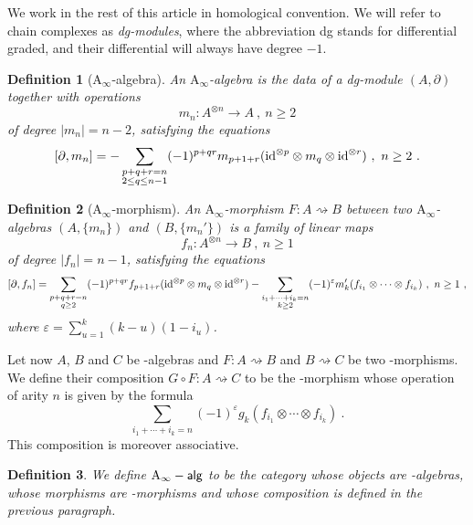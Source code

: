 \documentclass[twoside, 12pt]{amsart}
\newtheorem{definition}{Definition}[section]
\theoremstyle{remark}
\begin{document}
We work in the rest of this article in homological convention. We will refer to chain complexes as \emph{dg-modules}, where the abbreviation dg stands for differential graded, and their differential will always have degree $-1$.

\begin{definition}[$\mathrm{A}_\infty$-algebra] \label{def:ainf-alg} An \emph{$\mathrm{A}_\infty$-algebra} is the data of a dg-module $(A,\partial)$ together with operations \[ m_n : A^{\otimes n} \to A \ , \ n \geq 2 \] of degree $|m_n|=n-2$, satisfying the equations 
\[ [ \partial , m_n ] = - \sum_{\substack{p+q+r=n \\ 2 \leq q \leq n-1}} (-1)^{p+qr}m_{p+1+r}(\mathrm{id}^{\otimes p} \otimes m_q \otimes \mathrm{id}^{\otimes r}) \ , \ n\geq 2 \ . \]
\end{definition}

\begin{definition}[$\mathrm{A}_\infty$-morphism] \label{def:ainf-morph}
An \emph{$\mathrm{A}_\infty$-morphism} $F : A\rightsquigarrow B$ between two $\mathrm{A}_\infty$-algebras $(A,\{m_n\})$ and $(B,\{m_n'\})$ is a family of linear maps \[f_n : A^{\otimes n} \to B \ , \ n \geq 1\] of degree $|f_n|=n-1$, satisfying the equations  \[
 [ \partial , f_n] =  \sum_{\substack{p+q+r=n \\ q \geq 2}} (-1)^{p+qr}f_{p+1+r}(\mathrm{id}^{\otimes p} \otimes m_q \otimes \mathrm{id}^{\otimes r}) -  \sum_{\substack{i_1+\cdots+i_k=n \\ k \geq 2}} (-1)^{\varepsilon} m_k'(f_{i_1}\otimes\cdots\otimes f_{i_k})  \ , \ n \geq 1 \ ,\] where $\varepsilon = \sum_{u=1}^{k}(k-u)(1-i_u)$.
\end{definition}

Let now $A$, $B$ and $C$ be \Ainf -algebras and $F : A \rightsquigarrow B$ and $B \rightsquigarrow C$ be two \Ainf -morphisms. We define their composition $G \circ F : A \rightsquigarrow C$ to be the \Ainf -morphism whose operation of arity $n$ is given by the formula
\[ \sum_{i_1+\cdots+i_k=n} (-1)^{\varepsilon} g_k(f_{i_1}\otimes\cdots\otimes f_{i_k})  \ . \]
This composition is moreover associative.

\begin{definition}
We define $\mathsf{\mathrm{A}_\infty -alg}$ to be the category whose objects are \Ainf -algebras, whose morphisms are \Ainf -morphisms and whose composition is defined in the previous paragraph.
\end{definition}
\end{document}
